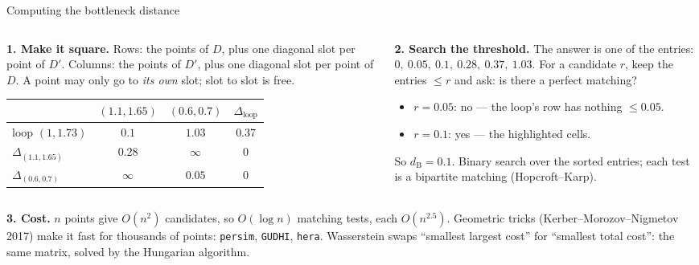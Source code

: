 \documentclass[10pt,aspectratio=169]{beamer}
\newcommand{\dB}{d_{\mathrm{B}}}
\newcommand{\HL}[1]{\textcolor{blue!70!black}{#1}}
\begin{document}
    \begin{frame}[shrink=5]{Computing the bottleneck distance}
        \begin{columns}[T,onlytextwidth]
            \begin{column}{0.5\textwidth}
                \small
                \textbf{1. Make it square.} Rows: the points of $D$, plus one diagonal slot
                per point of $D'$. Columns: the points of $D'$, plus one diagonal slot per
                point of $D$. A point may only go to \emph{its own} slot; slot to slot is
                free.
                \begin{center}
                    \footnotesize
                    \begin{tabular}{@{}l|ccc@{}}
                        & $(1.1,1.65)$ & $(0.6,0.7)$ & $\Delta_{\text{loop}}$ \\
                        \hline
                        loop $(1,1.73)$ & \HL{$0.1$} & $1.03$ & $0.37$ \\
                        $\Delta_{(1.1,1.65)}$ & $0.28$ & $\infty$ & \HL{$0$} \\
                        $\Delta_{(0.6,0.7)}$ & $\infty$ & \HL{$0.05$} & $0$ \\
                    \end{tabular}
                \end{center}
            \end{column}
            \begin{column}{0.48\textwidth}
                \small
                \textbf{2. Search the threshold.} The answer is one of the entries:
                $0,\ 0.05,\ 0.1,\ 0.28,\ 0.37,\ 1.03$. For a candidate $r$, keep the
                entries $\le r$ and ask: is there a perfect matching?
                \begin{itemize}
                    \item $r=0.05$: no --- the loop's row has nothing $\le0.05$.
                    \item $r=0.1$: yes --- the highlighted cells.
                \end{itemize}
                So $\dB=0.1$. Binary search over the sorted entries; each test is a
                bipartite matching (Hopcroft--Karp).
            \end{column}
        \end{columns}
        \vspace{0.5em}
        \small
        \textbf{3. Cost.} $n$ points give $O(n^2)$ candidates, so $O(\log n)$ matching tests,
        each $O(n^{2.5})$. Geometric tricks (Kerber--Morozov--Nigmetov 2017) make it fast for
        thousands of points: \texttt{persim}, \texttt{GUDHI}, \texttt{hera}.
        \alert{Wasserstein} swaps ``smallest largest cost'' for ``smallest total cost'': the
        same matrix, solved by the Hungarian algorithm.
    \end{frame}
\end{document}
